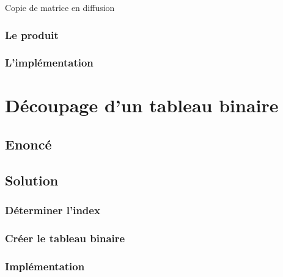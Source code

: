 \documentclass[oneside,11pt]{article}
\begin{document}
\begin{empfile}
\incmargin{1em}
\begin{algorithm}
  \label{diffusion}
  \caption{Copie de matrice en diffusion}
\end{algorithm}

\subsubsection{Le produit}



\subsubsection{L'implémentation}

\section{Découpage d'un tableau binaire}

\subsection{Enoncé}

\subsection{Solution}

\subsubsection{Déterminer l'index}

\subsubsection{Créer le tableau binaire}

\subsubsection{Implémentation}





\end{empfile}
\end{document}
